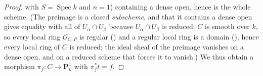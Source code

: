 \begin{proof}
 with \(S=\operatorname{Spec}k\)
and \(n=1\)) containing
a dense open, hence is the whole scheme.  (The preimage is a closed
\emph{subscheme}, and that it contains a dense open gives equality with
all of \(U_\alpha\cap U_\beta\) because \(U_\alpha\cap U_\beta\) is
reduced: \(C\) is smooth over \(k\), so every local ring
\(\mathcal O_{C,P}\) is regular () and a
regular local ring is a domain
(), hence every local ring of
\(C\) is reduced; the ideal sheaf of the preimage vanishes on a dense
open, and on a reduced scheme that forces it to vanish.)  We thus obtain a
morphism \(\pi_f:C\to\mathbf P^1_k\) with \(\pi_f^*t=f\).
\end{proof}

